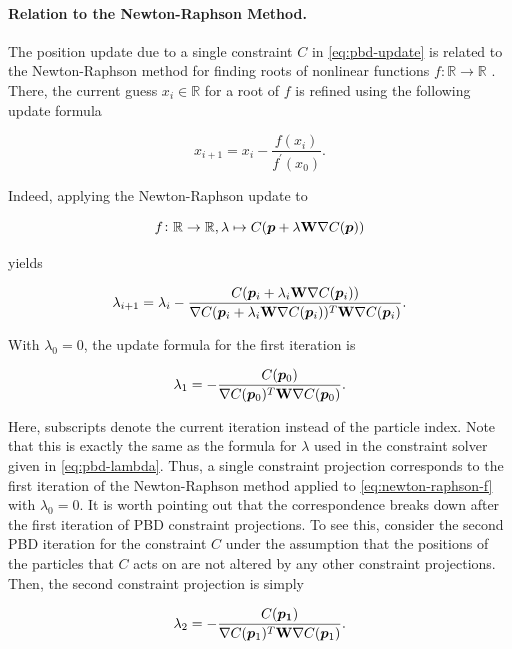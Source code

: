 \paragraph{Relation to the Newton-Raphson Method.}
The position update due to a single constraint $C$ in \autoref{eq:pbd-update} is related to the Newton-Raphson method for finding roots of nonlinear 
functions $f \colon \mathbb{R} \to \mathbb{R}$ \cite{mueller2006}. There, the current guess $x_i \in \mathbb{R}$ for a root of $f$ is refined 
using the following update formula 

\begin{equation}\label{eq:newton-raphson}
    x_{i+1} = x_i - \frac{f(x_i)}{f^{\prime}(x_0)}.
\end{equation}

\noindent Indeed, applying the Newton-Raphson update to 

\begin{equation}\label{eq:newton-raphson-f}
    f \colon \mathbb{R} \to \mathbb{R}, \lambda \mapsto C(\bm{p} + \lambda \mathbf{W} \nabla C(\bm{p}))
\end{equation}

\noindent yields

\[
    \lambda_{i+1} = \lambda_i - \frac{C(\bm{p}_i + \lambda_i \mathbf{W} \nabla C(\bm{p}_i))}
    {\nabla C(\bm{p}_i + \lambda_i \mathbf{W} \nabla C(\bm{p}_i))^T \mathbf{W} \nabla C(\bm{p}_i)}.
\]

\noindent With $\lambda_0 = 0$, the update formula for the first iteration is 

\[
    \lambda_1 = -\frac{C(\bm{p}_0)}{\nabla C(\bm{p}_0)^T \mathbf{W} \nabla C(\bm{p}_0)}.
\]

\noindent Here, subscripts denote the current iteration instead of the particle index. Note that this is exactly the same as the formula for 
$\lambda$ used in the constraint solver given in \autoref{eq:pbd-lambda}. Thus, a single 
constraint projection corresponds to the first iteration of the Newton-Raphson method applied to \autoref{eq:newton-raphson-f} with 
$\lambda_0 = 0$. It is worth pointing out that the correspondence breaks down after the first iteration of PBD constraint projections. To 
see this, consider the second PBD iteration for the constraint $C$ under the assumption that the positions of the particles that $C$ acts on 
are not altered by any other constraint projections. Then, the second constraint projection is simply

\[
    \lambda_2 = -\frac{C(\bm{p_1})}{\nabla C(\bm{p}_1)^T \mathbf{W} \nabla C(\bm{p}_1)}.
\]


